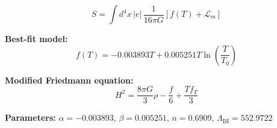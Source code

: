 
\begin{equation}
  S = \int d^4x \, |e| \, \frac{1}{16\pi G} \left[ f(T) + \mathcal{L}_m \right]
\end{equation}

\textbf{Best-fit model:}
\begin{equation}
  f(T) = -0.003893 T + 0.005251 T \ln\!\left(\frac{T}{T_0}\right)
\end{equation}

\textbf{Modified Friedmann equation:}
\begin{equation}
  H^2 = \frac{8\pi G}{3} \rho - \frac{f}{6} + \frac{T f_T}{3}
\end{equation}

\textbf{Parameters:}
$\alpha = -0.003893$, \quad
$\beta = 0.005251$, \quad
$n = 0.6909$, \quad
$\Lambda_{\text{BI}} = 552.9722$
